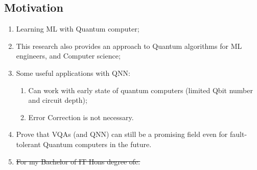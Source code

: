 \subsection{Motivation}

\begin{enumerate}
    \item Learning ML with Quantum computer;
    \item This research also provides an approach to Quantum algorithms for ML engineers, and Computer science;
    \item Some useful applications with QNN:
    \begin{enumerate}
        \item Can work with early state of quantum computers (limited Qbit number and circuit depth);
        \item Error Correction is not necessary.
    \end{enumerate}
    \item Prove that VQAs (and QNN) can still be a promising field even for fault-tolerant Quantum computers in the future.
    \item \st{For my Bachelor of IT Hons degree ofc.}
\end{enumerate}
